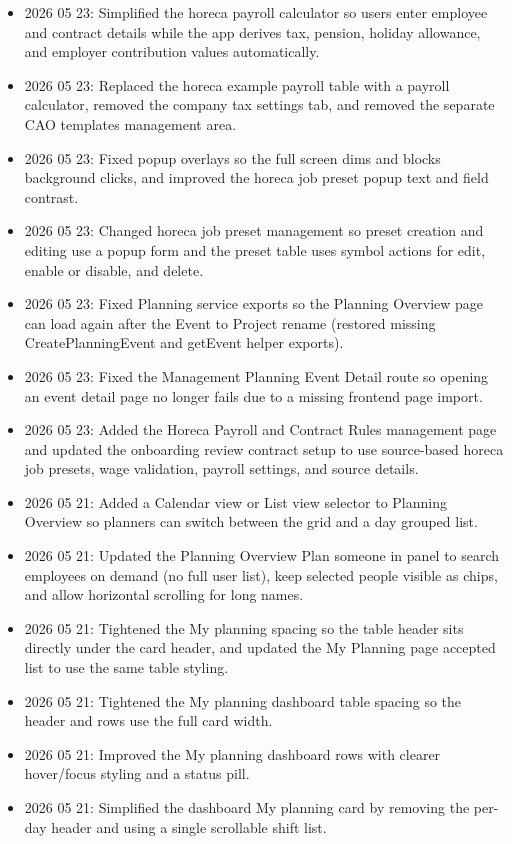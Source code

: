 \documentclass[11pt]{article}
\begin{document}
\begin{itemize}
    \item 2026 05 23: Simplified the horeca payroll calculator so users enter employee and contract details while the app derives tax, pension, holiday allowance, and employer contribution values automatically.
    \item 2026 05 23: Replaced the horeca example payroll table with a payroll calculator, removed the company tax settings tab, and removed the separate CAO templates management area.
    \item 2026 05 23: Fixed popup overlays so the full screen dims and blocks background clicks, and improved the horeca job preset popup text and field contrast.
    \item 2026 05 23: Changed horeca job preset management so preset creation and editing use a popup form and the preset table uses symbol actions for edit, enable or disable, and delete.
    \item 2026 05 23: Fixed Planning service exports so the Planning Overview page can load again after the Event to Project rename (restored missing CreatePlanningEvent and getEvent helper exports).
    \item 2026 05 23: Fixed the Management Planning Event Detail route so opening an event detail page no longer fails due to a missing frontend page import.
    \item 2026 05 23: Added the Horeca Payroll and Contract Rules management page and updated the onboarding review contract setup to use source-based horeca job presets, wage validation, payroll settings, and source details.
    \item 2026 05 21: Added a Calendar view or List view selector to Planning Overview so planners can switch between the grid and a day grouped list.
    \item 2026 05 21: Updated the Planning Overview Plan someone in panel to search employees on demand (no full user list), keep selected people visible as chips, and allow horizontal scrolling for long names.
    \item 2026 05 21: Tightened the My planning spacing so the table header sits directly under the card header, and updated the My Planning page accepted list to use the same table styling.
    \item 2026 05 21: Tightened the My planning dashboard table spacing so the header and rows use the full card width.
    \item 2026 05 21: Improved the My planning dashboard rows with clearer hover/focus styling and a status pill.
    \item 2026 05 21: Simplified the dashboard My planning card by removing the per-day header and using a single scrollable shift list.

\end{itemize}
\end{document}
